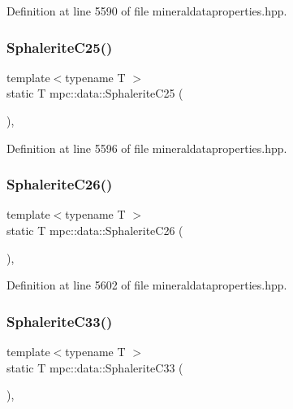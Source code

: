 Definition at line 5590 of file mineraldataproperties.\+hpp.

\mbox{\label{namespacempc_1_1data_ae7d1c9b71b2ab7a0e7d9971990c64d83}} 
\subsubsection{\texorpdfstring{Sphalerite\+C25()}{SphaleriteC25()}}
{\footnotesize\ttfamily template$<$typename T $>$ \\
static T mpc\+::data\+::\+Sphalerite\+C25 (\begin{DoxyParamCaption}{ }\end{DoxyParamCaption})\hspace{0.3cm}{\ttfamily [inline]}, {\ttfamily [static]}}



Definition at line 5596 of file mineraldataproperties.\+hpp.

\mbox{\label{namespacempc_1_1data_ab2ee996bfbf376bc7b0b67a247c409a0}} 
\subsubsection{\texorpdfstring{Sphalerite\+C26()}{SphaleriteC26()}}
{\footnotesize\ttfamily template$<$typename T $>$ \\
static T mpc\+::data\+::\+Sphalerite\+C26 (\begin{DoxyParamCaption}{ }\end{DoxyParamCaption})\hspace{0.3cm}{\ttfamily [inline]}, {\ttfamily [static]}}



Definition at line 5602 of file mineraldataproperties.\+hpp.

\mbox{\label{namespacempc_1_1data_abedae6a40d778c87c4007e5f3dc518b7}} 
\subsubsection{\texorpdfstring{Sphalerite\+C33()}{SphaleriteC33()}}
{\footnotesize\ttfamily template$<$typename T $>$ \\
static T mpc\+::data\+::\+Sphalerite\+C33 (\begin{DoxyParamCaption}{ }\end{DoxyParamCaption})\hspace{0.3cm}{\ttfamily [inline]}, {\ttfamily [static]}}



